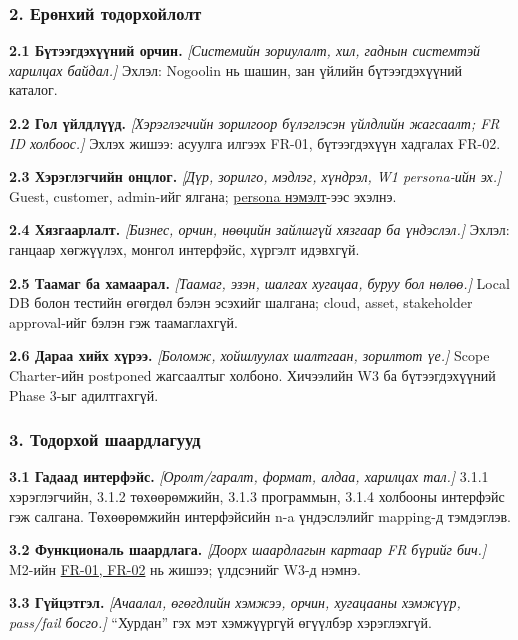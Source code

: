 \subsubsection{2. Ерөнхий
тодорхойлолт}\label{doc3-ux435ux440ux4e9ux43dux445ux438ux439-ux442ux43eux434ux43eux440ux445ux43eux439ux43bux43eux43bux442}

\textbf{2.1 Бүтээгдэхүүний орчин.} \emph{{[}Системийн зориулалт, хил,
гаднын системтэй харилцах байдал.{]}} Эхлэл: Nogoolin нь шашин, зан
үйлийн бүтээгдэхүүний каталог.

\textbf{2.2 Гол үйлдлүүд.} \emph{{[}Хэрэглэгчийн зорилгоор бүлэглэсэн
үйлдлийн жагсаалт; FR ID холбоос.{]}} Эхлэх жишээ: асуулга илгээх FR-01,
бүтээгдэхүүн хадгалах FR-02.

\textbf{2.3 Хэрэглэгчийн онцлог.} \emph{{[}Дүр, зорилго, мэдлэг,
хүндрэл, W1 persona-ийн эх.{]}} Guest, customer, admin-ийг ялгана;
\href{wiki/persona-and-pivot.md}{persona нэмэлт}-ээс эхэлнэ.

\textbf{2.4 Хязгаарлалт.} \emph{{[}Бизнес, орчин, нөөцийн зайлшгүй
хязгаар ба үндэслэл.{]}} Эхлэл: ганцаар хөгжүүлэх, монгол интерфэйс,
хүргэлт идэвхгүй.

\textbf{2.5 Таамаг ба хамаарал.} \emph{{[}Таамаг, эзэн, шалгах хугацаа,
буруу бол нөлөө.{]}} Local DB болон тестийн өгөгдөл бэлэн эсэхийг
шалгана; cloud, asset, stakeholder approval-ийг бэлэн гэж таамаглахгүй.

\textbf{2.6 Дараа хийх хүрээ.} \emph{{[}Боломж, хойшлуулах шалтгаан,
зорилтот үе.{]}} Scope Charter-ийн postponed жагсаалтыг холбоно.
Хичээлийн W3 ба бүтээгдэхүүний Phase 3-ыг адилтгахгүй.

\subsubsection{3. Тодорхой
шаардлагууд}\label{doc3-ux442ux43eux434ux43eux440ux445ux43eux439-ux448ux430ux430ux440ux434ux43bux430ux433ux443ux443ux434}

\textbf{3.1 Гадаад интерфэйс.} \emph{{[}Оролт/гаралт, формат, алдаа,
харилцах тал.{]}} 3.1.1 хэрэглэгчийн, 3.1.2 төхөөрөмжийн, 3.1.3
программын, 3.1.4 холбооны интерфэйс гэж салгана. Төхөөрөмжийн
интерфэйсийн n-a үндэслэлийг mapping-д тэмдэглэв.

\textbf{3.2 Функциональ шаардлага.} \emph{{[}Доорх шаардлагын картаар FR
бүрийг бич.{]}} M2-ийн \href{../../requirements/requirements.md}{FR-01,
FR-02} нь жишээ; үлдсэнийг W3-д нэмнэ.

\textbf{3.3 Гүйцэтгэл.} \emph{{[}Ачаалал, өгөгдлийн хэмжээ, орчин,
хугацааны хэмжүүр, pass/fail босго.{]}} ``Хурдан'' гэх мэт хэмжүүргүй
өгүүлбэр хэрэглэхгүй.


